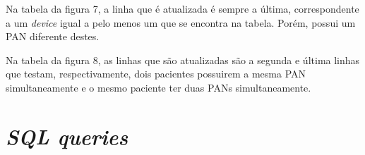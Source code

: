\documentclass[a4paper]{article}
\begin{document}
Na tabela da figura 7, a linha que é atualizada é sempre a última, correspondente a um \textit{device} igual a pelo menos um que se encontra na tabela. Porém, possui um PAN diferente destes.

Na tabela da figura 8, as linhas que são atualizadas são a segunda e última linhas que testam,  respectivamente, dois pacientes possuirem a mesma PAN simultaneamente e o mesmo paciente ter duas PANs simultaneamente.
\section{\textit{SQL queries}}
\end{document}
